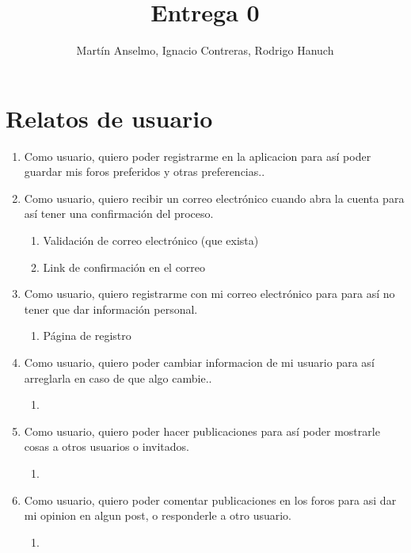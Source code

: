 \documentclass[12pt, letterpaper, notitlepage]{article}
\title{\textbf{Entrega 0}}
\author{Martín Anselmo, Ignacio Contreras, Rodrigo Hanuch}
\begin{document}
\clearpage\maketitle
\thispagestyle{empty}

\newpage

\section*{Relatos de usuario}
\newcommand{\story}[3]{Como {#1}, quiero {#2} para {#3}.}

\begin{enumerate}
	\item \story{usuario}{poder registrarme en la aplicacion}	
		{así poder guardar mis foros preferidos y otras preferencias.}
		

	\item \story{usuario}{recibir un correo electrónico cuando abra la cuenta}	
		{así tener una confirmación del proceso}
		\begin{enumerate}
			\item Validación de correo electrónico (que exista)
			\item Link de confirmación en el correo		
		\end{enumerate}
		
	\item \story{usuario}{registrarme con mi correo electrónico}{para así no tener que 
		dar información personal}
		\begin{enumerate}
			\item Página de registro
		\end{enumerate}
        
    		
	\item \story{usuario}{poder cambiar informacion de mi usuario}{así arreglarla en caso de que algo cambie.}
    	\begin{enumerate}
			\item
		\end{enumerate}
   
   
   \item \story{usuario}{poder hacer publicaciones}{así poder mostrarle cosas a otros usuarios o invitados}
       	\begin{enumerate}
			\item
		\end{enumerate}

   
   \item \story{usuario}{poder comentar publicaciones en los foros}{asi dar mi opinion en algun post, o responderle a otro usuario}
       	\begin{enumerate}
			\item
		\end{enumerate}


\end{enumerate}
\end{document}
